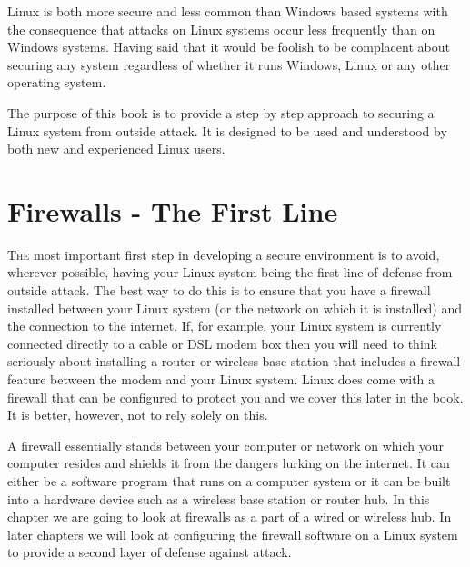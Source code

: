 Linux is both more secure and less common than Windows based systems with the
consequence that attacks on Linux systems occur less frequently than on Windows
systems. Having said that it would be foolish to be complacent about securing
any system regardless of whether it runs Windows, Linux or any other operating
system.



The purpose of this book is to provide a step by step approach to securing a
Linux system from outside attack. It is designed to be used and understood by
both new and experienced Linux users.

\subsectionend

\sectionend

\section{{Firewalls - The First Line}}
\label{sec:firewalls_the_first_line}

\lettrine[lines=3, findent=3pt, nindent=0pt]{T}{he} most important first step in
developing a secure environment is to avoid, wherever possible, having your
Linux system being the first line of defense from outside attack. The best way
to do this is to ensure that you have a firewall installed between your Linux
system (or the network on which it is installed) and the connection to the
internet. If, for example, your Linux system is currently connected directly to
a cable or DSL modem box then you will need to think seriously about installing
a router or wireless base station that includes a firewall feature between the
modem and your Linux system. Linux does come with a firewall that can be
configured to protect you and we cover this later in the book. It is better,
however,  not to rely solely on this.



A firewall essentially stands between your computer or network on which your
computer resides and shields it from the dangers lurking on the internet. It can
either be a software program that runs on a computer system or it can be built
into a hardware device such as a wireless base station or router hub. In this
chapter we are going to look at firewalls as a part of a wired or wireless hub.
In later chapters we will look at configuring the firewall software on a Linux
system to provide a second layer of defense against attack.



